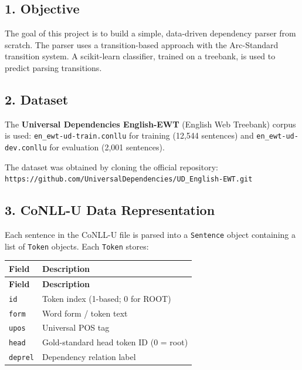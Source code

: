 \documentclass[11pt,a4paper]{article}
\begin{document}
\subsection*{1. Objective}

The goal of this project is to build a simple, data-driven dependency parser from scratch. The parser uses a transition-based approach with the Arc-Standard transition system. A scikit-learn classifier, trained on a treebank, is used to predict parsing transitions.

\subsection*{2. Dataset}

The \textbf{Universal Dependencies English-EWT} (English Web Treebank) corpus is used: \texttt{en\_\allowbreak{}ewt-\allowbreak{}ud-\allowbreak{}train.\allowbreak{}conllu} for training (12,544 sentences) and \texttt{en\_\allowbreak{}ewt-\allowbreak{}ud-\allowbreak{}dev.\allowbreak{}conllu} for evaluation (2,001 sentences).

The dataset was obtained by cloning the official repository: \texttt{https:/\allowbreak{}/\allowbreak{}github.\allowbreak{}com/\allowbreak{}UniversalDependencies/\allowbreak{}UD\_\allowbreak{}English-\allowbreak{}EWT.\allowbreak{}git}

\subsection*{3. CoNLL-U Data Representation}

Each sentence in the CoNLL-U file is parsed into a \texttt{Sentence} object containing a list of \texttt{Token} objects. Each \texttt{Token} stores:

{\small
\setlength{\tabcolsep}{4pt}
\begin{longtable}{ll}
\toprule
\textbf{Field} & \textbf{Description} \\
\midrule
\endfirsthead
\toprule
\textbf{Field} & \textbf{Description} \\
\midrule
\endhead
\texttt{id} & Token index (1-based; 0 for ROOT) \\
\texttt{form} & Word form / token text \\
\texttt{upos} & Universal POS tag \\
\texttt{head} & Gold-standard head token ID (0 = root) \\
\texttt{deprel} & Dependency relation label \\
\bottomrule
\end{longtable}}
\end{document}
